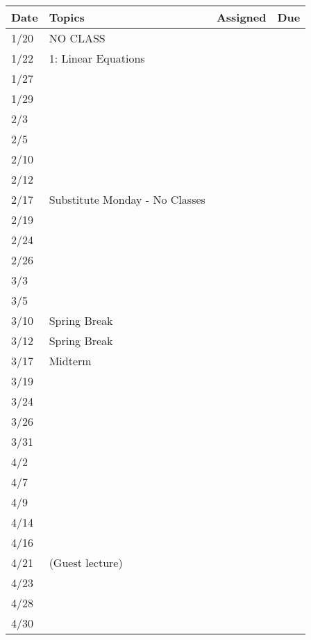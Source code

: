 \documentclass[11pt]{article}
\begin{document}
\small
\begin{centering}
\begin{tabular}{||l|p{3in}|l|l||}
\hline\hline
Date & Topics  & Assigned & Due  \\
\hline\hline
1/20 & NO CLASS && \\
1/22 & 1: Linear Equations &  & \\
\hline

1/27 & & & \\
1/29 & & & \\
\hline

2/3 & & & \\
2/5 & & & \\
\hline

2/10 & & & \\
2/12 & & & \\
\hline

2/17 & Substitute Monday - No Classes & & \\
2/19 & & & \\
\hline

2/24 & & & \\
2/26 & & & \\
\hline

3/3 & & & \\
3/5 & & & \\
\hline

3/10 & Spring Break &&\\
3/12 & Spring Break &&\\
\hline

3/17 & Midterm & & \\
3/19 & & & \\
\hline

3/24 & & & \\
3/26 & & & \\
\hline

3/31 & & & \\
4/2 & & & \\
\hline

4/7 & & & \\
4/9 & & & \\
\hline

4/14 & & & \\
4/16 & & & \\
 \hline

4/21 & (Guest lecture) & & \\
4/23 & & & \\
\hline

4/28 & & & \\
4/30 & & & \\
\hline\hline

\end{tabular}\\
\end{centering}
\end{document}
